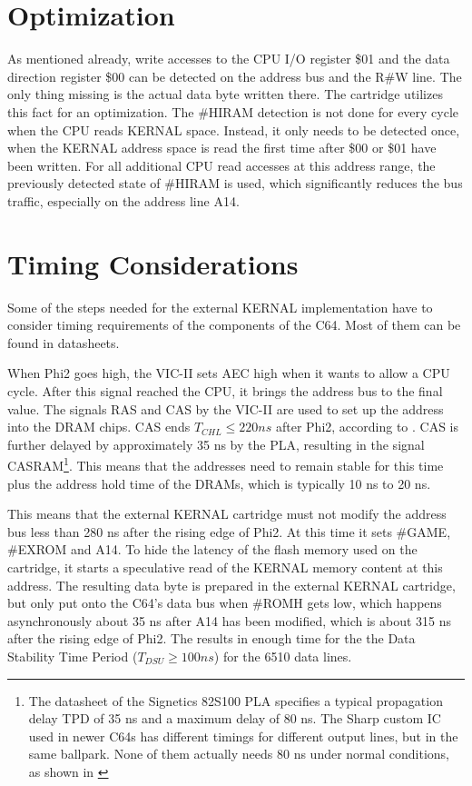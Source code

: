 \documentclass[a4paper,oneside]{memoir}
\begin{document}
\section{Optimization}

\label{sec:optimization}As mentioned already, write accesses to the CPU I/O register \$01 and the data direction register \$00 can be detected on the address bus and the R\#W line.
The only thing missing is the actual data byte written there. 
The cartridge utilizes this fact for an optimization.
The \#HIRAM detection is not done for every cycle when the CPU reads KERNAL space.
Instead, it only needs to be detected once, when the KERNAL address space is read the first time after \$00 or \$01 have been written.
For all additional CPU read accesses at this address range, the previously detected state of \#HIRAM is used, which significantly reduces the bus traffic, especially on the address line A14.

\section{Timing Considerations}

\label{sec:timing}Some of the steps needed for the external KERNAL implementation have
to consider timing requirements of the components of the C64. 
Most of them can be found in datasheets.

When Phi2 goes high, the VIC-II sets AEC high when it wants to allow a
CPU cycle. After this signal reached the CPU, it brings the address bus to the final value. 
The signals RAS and CAS by the VIC-II are used to set up the address into the DRAM chips.
CAS ends $T_{CHL} \le 220 ns$ after Phi2, according to \cite{VICII}.
CAS is further delayed by approximately 35 ns by the PLA, resulting in the signal CASRAM\footnote{The datasheet of the Signetics 82S100 PLA \cite{Si75} specifies a typical
propagation delay TPD of 35 ns and a maximum delay of 80 ns. The
Sharp custom IC used in newer C64s has different timings for
different output lines, but in the same ballpark. None of them actually needs 80 ns under normal conditions, as shown in \cite{PLA12}}.
This means that the addresses need to remain stable for this time plus the address hold time of the DRAMs, which is typically 10 ns to 20 ns.

This means that the external KERNAL cartridge must not modify the address bus less than 280 ns after the rising edge of Phi2.
At this time it sets \#GAME, \#EXROM and A14.
To hide the latency of the flash memory used on the cartridge, it starts a speculative read of the KERNAL memory content at this address.
The resulting data byte is prepared in the external KERNAL cartridge, but only put onto the C64's data bus when \#ROMH gets low, which happens asynchronously about 35 ns after A14 has been modified,   which is about 315 ns after the rising edge of Phi2.
The results in enough time for the the Data Stability Time Period ($T_{DSU} \ge 100 ns$) for the 6510 data lines. 
\end{document}
